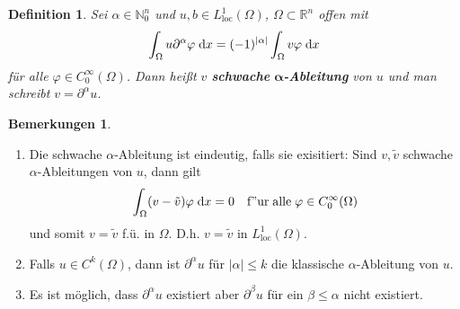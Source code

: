 \documentclass[
paper=a4,
bibtotocnumbered,
liststotocnumbered,
tablecaptionabove,
pointlessnumbers,
twoside,
openright,
10pt
]
{report}
\let\phi\varphi
\newtheorem{df}[thm]{Definition}
\theoremstyle{definition}
\newtheorem*{rems}{Bemerkungen}
\numberwithin{equation}{chapter}
\begin{document}
\begin{df}
Sei $\alpha\in\mathbb{N}_0^n$ und $u,b\in L_{\mathrm{loc}}^1(\Omega)$, $\Omega\subset\mathbb{R}^n$ offen mit
\begin{equation}
\int_\Omega u\partial^\alpha\phi\d x= (-1)^{|\alpha|}\int_\Omega v\phi \d x
\end{equation}
für alle $\phi\in C_0^\infty(\Omega)$. Dann heißt $v$ \textbf{schwache} $\boldsymbol{\alpha}$\textbf{-Ableitung} von $u$ und man schreibt $v=\partial^\alpha u$.
\end{df}

\begin{rems}
\begin{enumerate}[\bf 1)]
\item Die schwache $\alpha$-Ableitung ist eindeutig, falls sie exisitiert: Sind $v,\tilde{v}$ schwache $\alpha$-Ableitungen von $u$, dann gilt
\begin{equation}
\int_\Omega (v-\tilde{v})\phi\d x =0\quad\mathrm{f"ur\; alle\;}\phi\in C_0^\infty(\Omega)
\end{equation}
und somit $v=\tilde{v}$ f.ü. in $\Omega$. D.h. $v=\tilde{v}$ in  $L_{\mathrm{loc}}^1(\Omega)$. 
\item Falls $u\in C^k(\Omega)$, dann ist $\partial^\alpha u$ für $|\alpha|\leq k$ die klassische $\alpha$-Ableitung von $u$.
\item Es ist möglich, dass $\partial^\alpha u$ existiert aber $\partial^\beta u$ für ein $\beta\leq \alpha$ nicht existiert.
\end{enumerate}
\end{rems}
\end{document}
